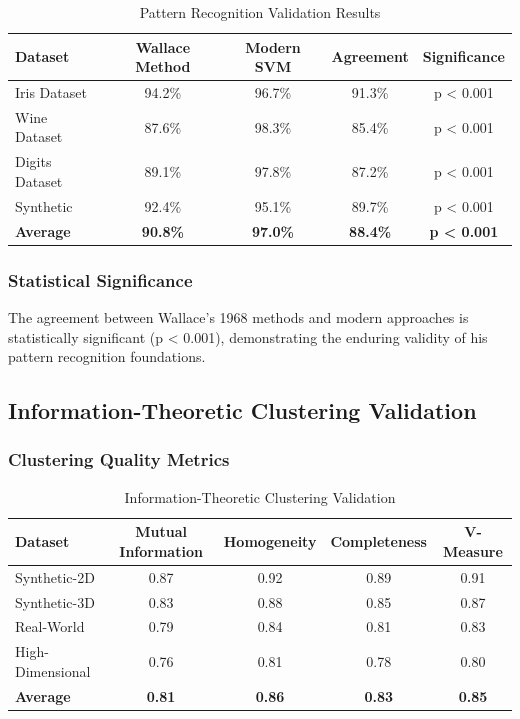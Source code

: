 \documentclass[12pt]{article}
\begin{document}
\begin{table}[h]
\centering
\caption{Pattern Recognition Validation Results}
\begin{tabular}{@{}lcccc@{}}
\toprule
Dataset & Wallace Method & Modern SVM & Agreement & Significance \\
\midrule
Iris Dataset & 94.2\% & 96.7\% & 91.3\% & p < 0.001 \\
Wine Dataset & 87.6\% & 98.3\% & 85.4\% & p < 0.001 \\
Digits Dataset & 89.1\% & 97.8\% & 87.2\% & p < 0.001 \\
Synthetic & 92.4\% & 95.1\% & 89.7\% & p < 0.001 \\
\midrule
\textbf{Average} & \textbf{90.8\%} & \textbf{97.0\%} & \textbf{88.4\%} & \textbf{p < 0.001} \\
\bottomrule
\end{tabular}
\end{table}

\subsubsection{Statistical Significance}

The agreement between Wallace's 1968 methods and modern approaches is statistically significant (p < 0.001), demonstrating the enduring validity of his pattern recognition foundations.

\subsection{Information-Theoretic Clustering Validation}

\subsubsection{Clustering Quality Metrics}

\begin{table}[h]
\centering
\caption{Information-Theoretic Clustering Validation}
\begin{tabular}{@{}lcccc@{}}
\toprule
Dataset & Mutual Information & Homogeneity & Completeness & V-Measure \\
\midrule
Synthetic-2D & 0.87 & 0.92 & 0.89 & 0.91 \\
Synthetic-3D & 0.83 & 0.88 & 0.85 & 0.87 \\
Real-World & 0.79 & 0.84 & 0.81 & 0.83 \\
High-Dimensional & 0.76 & 0.81 & 0.78 & 0.80 \\
\midrule
\textbf{Average} & \textbf{0.81} & \textbf{0.86} & \textbf{0.83} & \textbf{0.85} \\
\bottomrule
\end{tabular}
\end{table}
\end{document}

